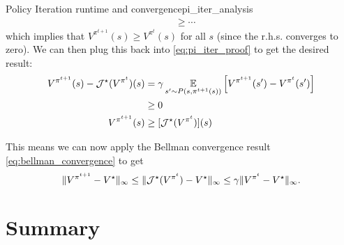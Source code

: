 \documentclass[\main/main]{subfiles}
\begin{document}
\begin{theorem}{Policy Iteration runtime and convergence}{pi_iter_analysis}
\begin{align*}
    &\ge \cdots
\end{align*}
which implies that $V^{\pi^{t+1}}(s) \ge V^{\pi^{t}}(s)$ for all $s$ (since the r.h.s. converges to zero). We can then plug this back into \eqref{eq:pi_iter_proof} to get the desired result:
\begin{align*}
    V^{\pi^{t+1}}(s) - \mathcal{J}^{\star} (V^{\pi^{t}})(s) &= \gamma \operatorname*{\mathbb{E}}_{s' \sim P(s, \pi^{t+1}(s))} \left[V^{\pi^{t+1}}(s') -  V^{\pi^{t}}(s') \right] \\
    &\ge 0 \\
    V^{\pi^{t+1}}(s) &\ge [\mathcal{J}^{\star}(V^{\pi^{t}})](s)
\end{align*}

This means we can now apply the Bellman convergence result \eqref{eq:bellman_convergence} to get
\[
    \|V^{\pi^{t+1}} - V^\star \|_{\infty} \le \|\mathcal{J}^{\star} (V^{\pi^{t}}) - V^{\star}\|_{\infty} \le \gamma \|V^{\pi^{t}} - V^\star \|_{\infty}.
\]
\end{theorem}

\section{Summary}
\end{document}

